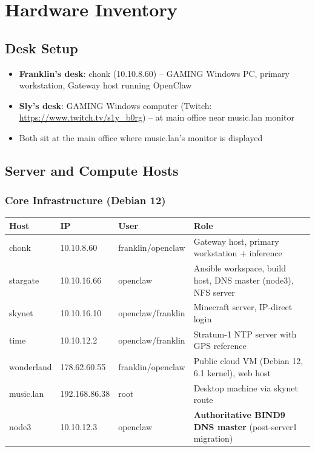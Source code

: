 \section{Hardware Inventory}

\subsection{Desk Setup}

\begin{itemize}
    \item \textbf{Franklin's desk}: chonk (10.10.8.60) -- GAMING Windows PC, primary workstation, Gateway host running OpenClaw
    
    \item \textbf{Sly's desk}: GAMING Windows computer (Twitch: \url{https://www.twitch.tv/s1y_b0rg}) -- at main office near music.lan monitor
    
    \item Both sit at the main office where music.lan's monitor is displayed
\end{itemize}

\subsection{Server and Compute Hosts}

\subsubsection*{Core Infrastructure (Debian 12)}

\begin{tabularx}{\textwidth}{l l l X}
\textbf{Host} & \textbf{IP} & \textbf{User} & \textbf{Role} \\
\hline
chonk & 10.10.8.60 & franklin/openclaw & Gateway host, primary workstation + inference \\
stargate & 10.10.16.66 & openclaw & Ansible workspace, build host, DNS master (node3), NFS server \\
skynet & 10.10.16.10 & openclaw/franklin & Minecraft server, IP-direct login \\
time & 10.10.12.2 & openclaw/franklin & Stratum-1 NTP server with GPS reference \\
wonderland & 178.62.60.55 & franklin/openclaw & Public cloud VM (Debian 12, 6.1 kernel), web host \\
music.lan & 192.168.86.38 & root & Desktop machine via skynet route \\
node3 & 10.10.12.3 & openclaw & \textbf{Authoritative BIND9 DNS master} (post-server1 migration) \\
\hline
\end{tabularx}

